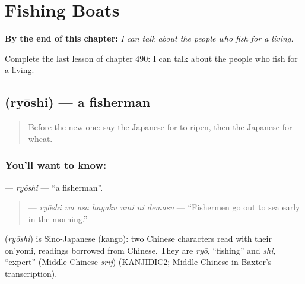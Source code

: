 
\chapter{Fishing Boats}
\label{ch:ja-fishing-boats}

\begin{chapteropening}
\textbf{By the end of this chapter:} \emph{I can talk about the people who fish for a living.}

Complete the last lesson of chapter 490: I can talk about the people who fish for a living.
\end{chapteropening}

\section[\texorpdfstring{\ja{りょうし} (ryōshi)}{りょうし (ryōshi)}]{ (ryōshi) — a fisherman}

\label{lesson:JA-C490-ryoushi}



\begin{quote}
Before the new one: say the Japanese for to ripen, then the Japanese for wheat.
\end{quote}

\subsection*{You'll want to know: }
\textbf{} — \emph{ryōshi} — \textquotedblleft{}a fisherman\textquotedblright{}.

\begin{quote}
\textbf{    } — \emph{ryōshi wa asa hayaku umi ni demasu} — \textquotedblleft{}Fishermen go out to sea early in the morning.\textquotedblright{}
\end{quote}

\begin{cousinweb}
\textbf{} (\emph{ryōshi}) is Sino-Japanese (kango): two Chinese characters read with their on'yomi, readings borrowed from Chinese. They are \emph{ryō}, \textquotedblleft{}fishing\textquotedblright{} and \emph{shi}, \textquotedblleft{}expert\textquotedblright{} (Middle Chinese \emph{srij}) (KANJIDIC2; Middle Chinese in Baxter's transcription).
\end{cousinweb}

